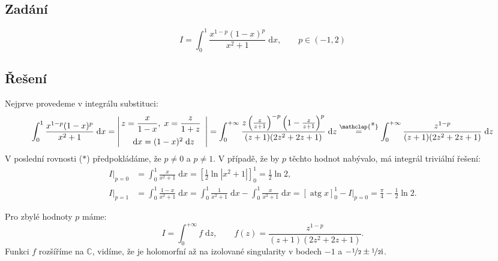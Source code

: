 \documentclass[10pt,a4paper]{article}
\newcommand{\const}[1]{\text{#1}}
\newcommand{\atg}{\operatorname{atg}}
\renewcommand{\d}[1]{\;\const{d}#1}
\renewcommand{\i}{\const{i}}
\begin{document}
\subsection{Zadání}
\begin{equation*}
    I = \int_0^1 \frac{x^{1-p} (1-x)^p}{x^2+1} \d{x},
    \hspace{2em}
    p \in (-1, 2)
\end{equation*}

\subsection{Řešení}
Nejprve provedeme v integrálu substituci:
\begin{equation*}
    \int_0^1 \frac{x^{1-p} (1-x)^p}{x^2+1} \d{x}
    = \left| \begin{array}{c}
        \!\!z = \dfrac{x}{1-x}, \; x = \dfrac{z}{1+z} \\[10pt]
        \d{x} = (1-x)^2 \d{z}
    \end{array} \right|
    = \int_0^{+\infty} \frac{z \left(\frac{z}{z+1}\right)^{-p} \left(1 - \frac{z}{z+1}\right)^p}{(z+1)(2z^2 + 2z + 1)} \d{z}
    \stackrel{\mathclap{\normalfont\mbox{*}}}{=}
    \int_0^{+\infty} \frac{z^{1-p}}{(z+1)(2z^2 + 2z + 1)} \d{z}
\end{equation*}
V poslední rovnosti ($*$) předpokládáme, že $p\neq0$ a $p\neq 1$. V případě, že by $p$ těchto hodnot nabývalo, má integrál triviální řešení:
\begin{align*}
    I|_{p=0} &= \int_0^1 \frac{x}{x^2 + 1} \d{x} = \left[ \frac{1}{2} \ln |x^2 + 1 | \right]_0^1 = \frac{1}{2} \ln 2,
    \\[5pt]
    I|_{p=1} &= \int_0^1 \frac{1-x}{x^2+1} \d{x} = \int_0^1 \frac{1}{x^2+1} \d{x} - \int_0^1 \frac{x}{x^2 + 1} \d{x} = \left[\atg x\right]_0^1 - I|_{p=0} = \frac{\pi}{4} - \frac{1}{2} \ln 2.
\end{align*}

Pro zbylé hodnoty $p$ máme:
\begin{equation*}
    I = \int_0^{+\infty} f \d{z},
    \hspace{2em}
    f(z) = \frac{z^{1-p}}{(z+1)(2z^2 + 2z + 1)}.
\end{equation*}
Funkci $f$ rozšíříme na $\mathbb{C}$, vidíme, že je holomorfní až na izolované singularity v bodech $-1$ a $-\nicefrac{1}{2} \pm \nicefrac{1}{2} \i$.
\end{document}
